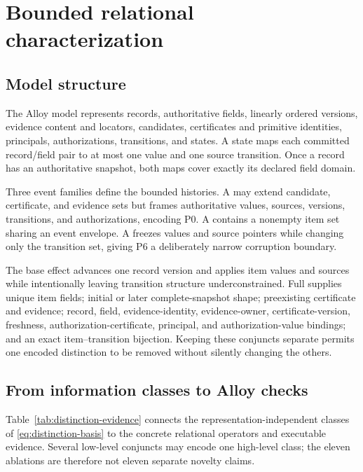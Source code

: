 \section{Bounded relational characterization}
\label{sec:alloy}

\subsection{Model structure}

The Alloy model represents records, authoritative fields, linearly ordered versions, evidence content and locators, candidates, certificates and primitive identities, principals, authorizations, transitions, and states. A state maps each committed record/field pair to at most one value and one source transition. Once a record has an authoritative snapshot, both maps cover exactly its declared field domain.

Three event families define the bounded histories. A  may extend candidate, certificate, and evidence sets but frames authoritative values, sources, versions, transitions, and authorizations, encoding P0. A  contains a nonempty item set sharing an event envelope. A  freezes values and source pointers while changing only the transition set, giving P6 a deliberately narrow corruption boundary.

The base effect advances one record version and applies item values and sources while intentionally leaving transition structure underconstrained. Full supplies unique item fields; initial or later complete-snapshot shape; preexisting certificate and evidence; record, field, evidence-identity, evidence-owner, certificate-version, freshness, authorization-certificate, principal, and authorization-value bindings; and an exact item--transition bijection. Keeping these conjuncts separate permits one encoded distinction to be removed without silently changing the others.

\subsection{From information classes to Alloy checks}

Table~\ref{tab:distinction-evidence} connects the representation-independent classes of \cref{eq:distinction-basis} to the concrete relational operators and executable evidence. Several low-level conjuncts may encode one high-level class; the eleven ablations are therefore not eleven separate novelty claims.

